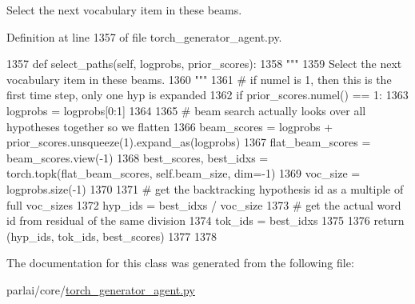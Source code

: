 \begin{DoxyVerb}Select the next vocabulary item in these beams.
\end{DoxyVerb}
 

Definition at line 1357 of file torch\+\_\+generator\+\_\+agent.\+py.


\begin{DoxyCode}
1357     \textcolor{keyword}{def }select\_paths(self, logprobs, prior\_scores):
1358         \textcolor{stringliteral}{"""}
1359 \textcolor{stringliteral}{        Select the next vocabulary item in these beams.}
1360 \textcolor{stringliteral}{        """}
1361         \textcolor{comment}{# if numel is 1, then this is the first time step, only one hyp is expanded}
1362         \textcolor{keywordflow}{if} prior\_scores.numel() == 1:
1363             logprobs = logprobs[0:1]
1364 
1365         \textcolor{comment}{# beam search actually looks over all hypotheses together so we flatten}
1366         beam\_scores = logprobs + prior\_scores.unsqueeze(1).expand\_as(logprobs)
1367         flat\_beam\_scores = beam\_scores.view(-1)
1368         best\_scores, best\_idxs = torch.topk(flat\_beam\_scores, self.beam\_size, dim=-1)
1369         voc\_size = logprobs.size(-1)
1370 
1371         \textcolor{comment}{# get the backtracking hypothesis id as a multiple of full voc\_sizes}
1372         hyp\_ids = best\_idxs / voc\_size
1373         \textcolor{comment}{# get the actual word id from residual of the same division}
1374         tok\_ids = best\_idxs %
1375 
1376         \textcolor{keywordflow}{return} (hyp\_ids, tok\_ids, best\_scores)
1377 
1378 
\end{DoxyCode}


The documentation for this class was generated from the following file\+:\begin{DoxyCompactItemize}
\item 
parlai/core/\hyperlink{torch__generator__agent_8py}{torch\+\_\+generator\+\_\+agent.\+py}\end{DoxyCompactItemize}
